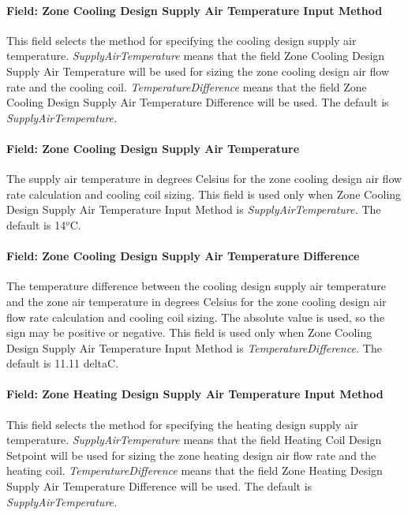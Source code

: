 \paragraph{Field: Zone Cooling Design Supply Air Temperature Input Method}\label{field-zone-cooling-design-supply-air-temperature-input-method-2}

This field selects the method for specifying the cooling design supply air temperature. \emph{SupplyAirTemperature} means that the field Zone Cooling Design Supply Air Temperature will be used for sizing the zone cooling design air flow rate and the cooling coil. \emph{TemperatureDifference} means that the field Zone Cooling Design Supply Air Temperature Difference will be used. The default is \emph{SupplyAirTemperature.}

\paragraph{Field: Zone Cooling Design Supply Air Temperature}\label{field-zone-cooling-design-supply-air-temperature-1}

The supply air temperature in degrees Celsius for the zone cooling design air flow rate calculation and cooling coil sizing. This field is used only when Zone Cooling Design Supply Air Temperature Input Method is \emph{SupplyAirTemperature.} The default is 14\(^{o}\)C.

\paragraph{Field: Zone Cooling Design Supply Air Temperature Difference}\label{field-zone-cooling-design-supply-air-temperature-difference-2}

The temperature difference between the cooling design supply air temperature and the zone air temperature in degrees Celsius for the zone cooling design air flow rate calculation and cooling coil sizing. The absolute value is used, so the sign may be positive or negative. This field is used only when Zone Cooling Design Supply Air Temperature Input Method is \emph{TemperatureDifference.} The default is 11.11 deltaC.

\paragraph{Field: Zone Heating Design Supply Air Temperature Input Method}\label{field-zone-heating-design-supply-air-temperature-input-method-2}

This field selects the method for specifying the heating design supply air temperature. \emph{SupplyAirTemperature} means that the field Heating Coil Design Setpoint will be used for sizing the zone heating design air flow rate and the heating coil. \emph{TemperatureDifference} means that the field Zone Heating Design Supply Air Temperature Difference will be used. The default is \emph{SupplyAirTemperature.}

